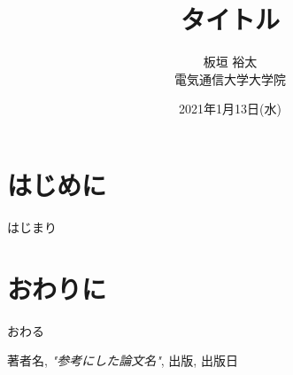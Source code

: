 \documentclass[uplatex, twocolumn,10pt]{jsarticle}
\begin{document}
\title{タイトル}
\author{板垣 裕太\\電気通信大学大学院}
\date{2021年1月13日(水)}
\maketitle


\section{はじめに}
はじまり

\section{おわりに}
おわる

\begin{thebibliography}{99}
     著者名, {\it "参考にした論文名"}, 出版, 出版日
\end{thebibliography}
\end{document}
